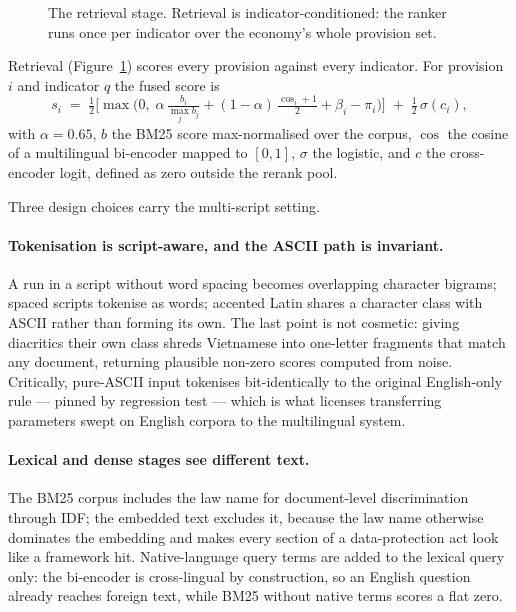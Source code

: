 \documentclass{article}
\begin{document}
\begin{figure}[t]
\centering
\resizebox{0.96\linewidth}{!}{}
\caption{The retrieval stage. Retrieval is indicator-conditioned: the ranker runs
once per indicator over the economy's whole provision set.}
\label{fig:retrieval}
\end{figure}

Retrieval (Figure~\ref{fig:retrieval}) scores every provision against every
indicator. For provision $i$ and indicator $q$ the fused score is
\[
  s_i \;=\; \tfrac12\Big[\max\big(0,\;
      \alpha\,\tfrac{b_i}{\max_j b_j}
      + (1-\alpha)\,\tfrac{\cos_i + 1}{2}
      + \beta_i - \pi_i \big)\Big] \;+\; \tfrac12\,\sigma(c_i),
\]
with $\alpha=0.65$, $b$ the BM25 score max-normalised over the corpus, $\cos$ the
cosine of a multilingual bi-encoder mapped to $[0,1]$, $\sigma$ the logistic, and
$c$ the cross-encoder logit, defined as zero outside the rerank pool.

Three design choices carry the multi-script setting.

\paragraph{Tokenisation is script-aware, and the ASCII path is invariant.} A run
in a script without word spacing becomes overlapping character bigrams; spaced
scripts tokenise as words; accented Latin shares a character class with ASCII
rather than forming its own. The last point is not cosmetic: giving diacritics
their own class shreds Vietnamese into one-letter fragments that match any
document, returning plausible non-zero scores computed from noise. Critically,
pure-ASCII input tokenises bit-identically to the original English-only rule ---
pinned by regression test --- which is what licenses transferring parameters
swept on English corpora to the multilingual system.

\paragraph{Lexical and dense stages see different text.} The BM25 corpus includes
the law name for document-level discrimination through IDF; the embedded text
excludes it, because the law name otherwise dominates the embedding and makes
every section of a data-protection act look like a framework hit. Native-language
query terms are added to the lexical query only: the bi-encoder is cross-lingual
by construction, so an English question already reaches foreign text, while BM25
without native terms scores a flat zero.
\end{document}
